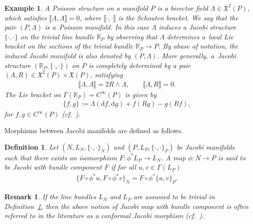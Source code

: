 \documentclass[10pt,a4paper]{amsart}
\numberwithin{equation}{section}
\newtheorem{Definition}[Theorem]{Definition}
\newtheorem{Example}[Theorem]{Example}
\newtheorem{Remark}[Theorem]{Remark} }
\newcommand{\X}{\ensuremath{\mathfrak{X}}}
\newcommand{\de}{\mathrm{d}} %
\newcommand{\RR}{\mathbb{R}}
\begin{document}
\begin{Example}\label{obs:kir} A {\it Poisson structure} on a manifold $P$ is a bivector f\/ield $\Lambda \in \X^2(P)$, which satisf\/ies $\llbracket \Lambda,\Lambda \rrbracket=0$, where $\llbracket \cdot, \cdot \rrbracket$ is the Schouten bracket. We say that the pair $(P,\Lambda)$ is a~{\it Poisson manifold}. In this case $\Lambda$ induces a Jacobi structure $\{\cdot,\cdot\}$ on the trivial line bundle $\RR_P$ by observing that $\Lambda$ determines a~local Lie bracket on the sections of the trivial bundle $\RR_P \to P$. By abuse of notation, the induced Jacobi manifold is also
denoted by $(P,\Lambda)$. More generally, a~Jacobi structure $(\RR_P,\{\cdot, \cdot\})$ on $P$ is completely determined by a pair
$(\Lambda, R) \in \X^2(P) \times \X(P)$, satisfying
\begin{gather*} %
 \llbracket \Lambda,\Lambda \rrbracket =2R\wedge\Lambda,\qquad \llbracket \Lambda,R \rrbracket=0.
\end{gather*}
The Lie bracket on $\Gamma(\RR_P) = C^{\infty}(P)$ is given by
\begin{gather*}
 \{f,g\} := \Lambda(\de f, \de g) + f (Rg) - g(Rf),
\end{gather*}
for $f,g \in C^{\infty}(P)$ (cf.~\cite{Lich78}).
\end{Example}

Morphisms between Jacobi manifolds are def\/ined as follows.

\begin{Definition}\label{defn:jacobi_maps}
 Let $(N, L_N,\{\cdot,\cdot\}_N)$ and $(P, L_P, \{\cdot,\cdot\}_P)$ be Jacobi manifolds such that there exists an isomorphism $F\colon \phi^*L_P \to
 L_N$. A map $\phi \colon N \to P$ is said to be {\it Jacobi} with {\it bundle component} $F$ if for all $u,v \in \Gamma(L_P)$
 \begin{gather*}
 \{F \circ \phi^*u, F \circ \phi^*v\}_N = F \circ \phi^*\{u,v\}_P.
 \end{gather*}
\end{Definition}

\begin{Remark}
 If the line bundles $L_N$ and $L_P$ are assumed to be trivial in Def\/inition~\ref{defn:jacobi_maps}, then the above notion of Jacobi map with bundle component is often referred to in the literature as a {\em conformal} Jacobi morphism (cf.\ \cite[Section~1.6]{Dazord-Lich-Marle91}).
\end{Remark}
\end{document}
